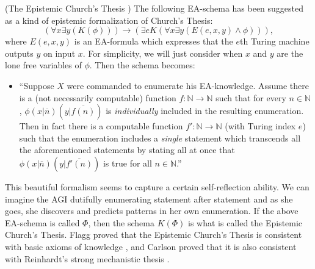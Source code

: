 \documentclass[runningheads]{llncs}
\begin{document}
\begin{example}
\label{ectexample}
  (The Epistemic Church's Thesis \cite{flagg1985church} \cite{carlson2016collapsing})
  The following EA-schema has been suggested as a kind of epistemic formalization
  of Church's Thesis:
  \[
  ( \forall x\exists y (K(\phi))  ) \rightarrow
  ( \exists e K( \forall x\exists y ( E(e,x,y) \wedge \phi  )  )  ),
  \]
  where $E(e,x,y)$ is an EA-formula which expresses that the $e$th Turing machine
  outputs $y$ on input $x$.
  For simplicity, we will just consider when $x$ and $y$ are the lone free variables
  of $\phi$.
  Then the schema becomes:
  \begin{itemize}
    \item
    ``Suppose $X$ were commanded to enumerate his EA-knowledge.
    Assume there is a (not necessarily computable) function
    $f:\mathbb N\to\mathbb N$ such that for every $n\in\mathbb N$,
    $\phi(x|\overline n)(y|\overline{f(n)})$ is \emph{individually}
    included in the resulting enumeration.
    Then in fact there is a computable
    function $f':\mathbb N\to\mathbb N$ (with Turing index $e$)
    such that the enumeration includes
    a \emph{single} statement which transcends all the aforementioned statements
    by stating all at once that $\phi(x|\overline n)(y|\overline{f'(n)})$
    is true for all $n\in\mathbb N$.''
  \end{itemize}
  This beautiful formalism seems to capture a certain self-reflection ability.
  We can imagine the AGI dutifully enumerating statement after statement and
  as she goes, she discovers and predicts patterns in her own enumeration.
  If the above EA-schema is called $\Phi$, then the schema $K(\Phi)$ is what is called
  the Epistemic Church's Thesis.
  Flagg proved that the Epistemic Church's Thesis is
  consistent with basic axioms of knowledge \cite{flagg1985church},
  and Carlson proved that it is also consistent with
  Reinhardt's strong mechanistic thesis \cite{carlson2016collapsing}.
\end{example}
\end{document}
